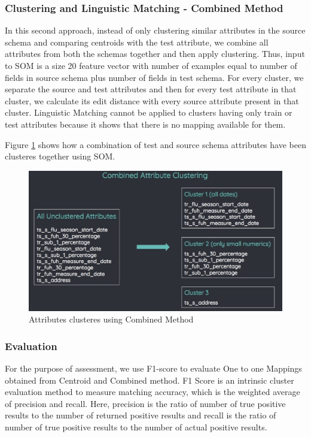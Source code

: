\documentclass[conference]{IEEEtran}
\begin{document}
\subsubsection*{\textbf{Clustering and Linguistic Matching - Combined Method}}
In this second approach, instead of only clustering similar attributes in the source schema and comparing centroids with the test attribute, we combine all attributes from both the schemas together and then apply clustering. Thus, input to SOM is a size 20 feature vector with number of examples equal to number of fields in source schema plus number of fields in test schema. For every cluster, we separate the source and test attributes and then for every test attribute in that cluster, we calculate its edit distance with every source attribute present in that cluster. Linguistic Matching cannot be applied to clusters having only train or test attributes because it shows that there is no mapping available for them. 

Figure \ref{combined} shows how a combination of test and source schema attributes have been clusteres together using SOM.\\

\begin{figure}
\centering
\includegraphics[scale=0.25]{combined.jpeg}
\caption{Attributes clusteres using Combined Method}
\label{combined}
\end{figure}

\vspace{5em}
\subsubsection*{\textbf{Evaluation}}
For the purpose of assessment, we use F1-score to evaluate One to one Mappings obtained from Centroid and Combined method. F1 Score is an intrinsic cluster evaluation method to measure matching accuracy, which is the weighted average of precision and recall. Here, precision is the ratio of number of true positive results to the number of returned positive results and recall is the ratio of number of true positive results to the number of actual positive results.
\end{document}
